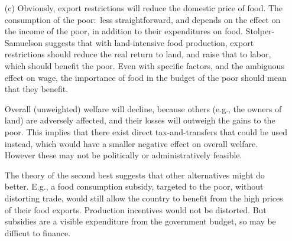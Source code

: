 \begin{enumerate}
\begin{enumerate}
		\begin{itemize}
			\item [(c)] Obviously, export restrictions will reduce the domestic price of food. The consumption of the poor:\ less straightforward, and depends on the effect on the income of the poor, in addition to their expenditures on food. Stolper-Samuelson suggests that with land-intensive food production, export restrictions should reduce the real return to land, and raise that to labor, which should benefit the poor. Even with specific factors, and the ambiguous effect on wage, the importance of food in the budget of the poor should mean that they benefit.

 Overall (unweighted) welfare will decline, because others (e.g., the owners of land) are adversely affected, and their losses will outweigh the gains to the poor. This implies that there exist direct tax-and-transfers that could be used instead, which would have a smaller negative effect on overall welfare. However these may not be politically or administratively feasible.

 The theory of the second best suggests that other alternatives might do better. E.g., a food consumption subsidy, targeted to the poor, without distorting trade, would still allow the country to benefit from the high prices of their food exports. Production incentives would not be distorted. But subsidies are a visible expenditure from the government budget, so may be difficut to finance.
		\end{itemize}
\end{enumerate}
\end{enumerate}


















